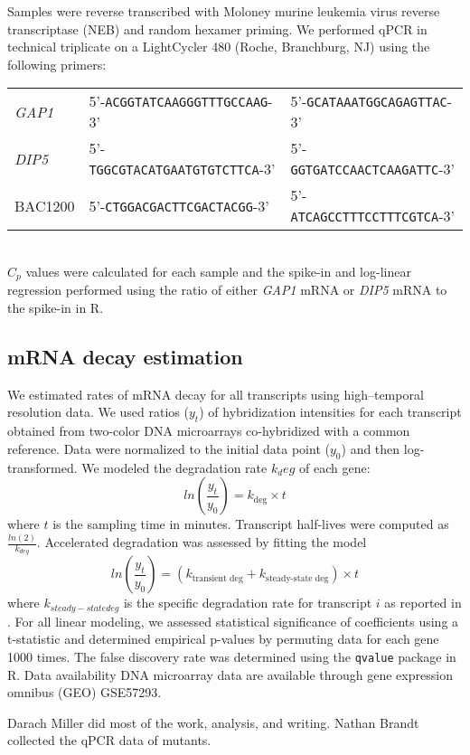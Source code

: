 Samples were reverse
transcribed with Moloney murine leukemia virus reverse transcriptase
(NEB) and random hexamer priming. We performed qPCR in technical
triplicate on a LightCycler 480 (Roche, Branchburg, NJ) using the
following primers: \\[1em]
\begin{tabular}{l | p{15em} p{15em}}
  \textit{GAP1} & 5'-\texttt{ACGGTATCAAGGGTTTGCCAAG}-3' &
    5'-\texttt{GCATAAATGGCAGAGTTAC}-3' \\
  \textit{DIP5} & 5'-\texttt{TGGCGTACATGAATGTGTCTTCA}-3' &
    5'-\texttt{GGTGATCCAACTCAAGATTC}-3' \\
  BAC1200 & 5'-\texttt{CTGGACGACTTCGACTACGG}-3' & 
    5'-\texttt{ATCAGCCTTTCCTTTCGTCA}-3' \\
\end{tabular} \\[1em]
$C_p$ values
were calculated for each sample and the spike-in and log-linear
regression performed using the ratio of either \textit{GAP1} mRNA or \textit{DIP5} mRNA
to the spike-in in R.  

\subsection{mRNA decay estimation}

We estimated rates of
mRNA decay for all transcripts using high–temporal resolution data. We
used ratios ($y_t$) of hybridization intensities for each transcript
obtained from two-color DNA microarrays co-hybridized with a common
reference. Data were normalized to the initial data point ($y_0$) and
then log-transformed. We modeled the degradation rate $k_deg$ of each
gene:
$$ ln\left(\frac{y_t}{y_0}\right)=k_{\text{deg}}\times t$$
where $t$ is the sampling time in minutes. Transcript
half-lives were computed as $\frac{ln(2)}{k_{deg}}$. 
Accelerated degradation was
assessed by fitting the model 
$$ ln\left(\frac{y_t}{y_0}\right)=(k_{\text{transient
deg}}+k_{\text{steady-state deg}})\times t$$
where $k_{steady-state deg}$ 
is the specific degradation rate for transcript $i$ as reported in 
\cite{neymotin2014determination}.
For all linear modeling, we assessed statistical
significance of coefficients using a t-statistic and determined
empirical p-values by permuting data for each gene 1000 times. The
false discovery rate was determined using the \texttt{qvalue} package in R.
Data availability DNA microarray data are available through gene
expression omnibus (GEO) GSE57293.

Darach Miller did most of the work, analysis, and writing.
Nathan Brandt collected the qPCR data of mutants.
